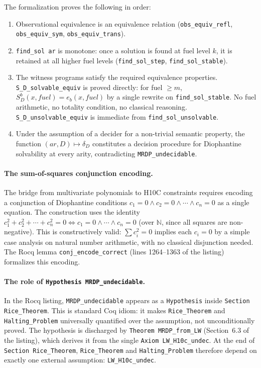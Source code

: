 \documentclass{lmcs}
\begin{document}
The formalization proves the following in order:
\begin{enumerate}
  \item Observational equivalence is an equivalence relation
        (\texttt{obs\_equiv\_refl}, \texttt{obs\_equiv\_sym},
        \texttt{obs\_equiv\_trans}).
  \item \texttt{find\_sol ar} is monotone: once a solution is found at fuel
        level $k$, it is retained at all higher fuel levels
        (\texttt{find\_sol\_step}, \texttt{find\_sol\_stable}).
  \item The witness programs satisfy the required equivalence properties.
        \texttt{S\_D\_solvable\_equiv} is proved directly: for fuel $\geq m$,
        $S_D^b(x, \mathit{fuel}) = e_b(x, \mathit{fuel})$ by a single rewrite
        on \texttt{find\_sol\_stable}. No fuel arithmetic, no totality
        condition, no classical reasoning.
        \texttt{S\_D\_unsolvable\_equiv} is immediate from
        \texttt{find\_sol\_unsolvable}.
  \item Under the assumption of a decider for a non-trivial semantic property,
        the function $(ar, D) \mapsto \delta_D$ constitutes a decision procedure
        for Diophantine solvability at every arity, contradicting
        \texttt{MRDP\_undecidable}.
\end{enumerate}

\paragraph{The sum-of-squares conjunction encoding.}
The bridge from multivariate polynomials to H10C constraints
requires encoding a conjunction of Diophantine conditions
$c_1 = 0 \wedge c_2 = 0 \wedge \cdots \wedge c_n = 0$
as a single equation. The construction uses the identity
$c_1^2 + c_2^2 + \cdots + c_n^2 = 0 \iff
c_1 = 0 \wedge \cdots \wedge c_n = 0$ (over $\mathbb{N}$,
since all squares are non-negative). This is
constructively valid: $\sum c_i^2 = 0$ implies each $c_i = 0$
by a simple case analysis on natural number arithmetic,
with no classical disjunction needed. The Rocq lemma
\texttt{conj\_encode\_correct} (lines 1264--1363 of the listing)
formalizes this encoding.

\paragraph{The role of \texttt{Hypothesis MRDP\_undecidable}.}
In the Rocq listing, \texttt{MRDP\_undecidable} appears as a
\texttt{Hypothesis} inside \texttt{Section Rice\_Theorem}.
This is standard Coq idiom: it makes \texttt{Rice\_Theorem} and
\texttt{Halting\_Problem} universally quantified over the assumption,
not unconditionally proved.  The hypothesis is discharged by
\texttt{Theorem MRDP\_from\_LW} (Section~6.3 of the listing),
which derives it from the single \texttt{Axiom LW\_H10c\_undec}.
At the end of \texttt{Section Rice\_Theorem}, \texttt{Rice\_Theorem}
and \texttt{Halting\_Problem} therefore depend on exactly one external
assumption: \texttt{LW\_H10c\_undec}.
\end{document}
